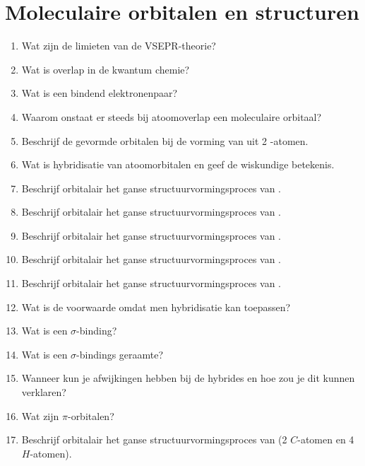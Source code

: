 \documentclass[a4paper,12pt]{article}
\begin{document}
    \maketitle

    \section{Moleculaire orbitalen en structuren}

    \begin{enumerate}
        \item Wat zijn de limieten van de VSEPR-theorie?
        \item Wat is overlap in de kwantum chemie?
        \item Wat is een bindend elektronenpaar?
        \item Waarom onstaat er steeds bij atoomoverlap een moleculaire orbitaal?
        \item Beschrijf de gevormde orbitalen bij de vorming van  uit 2 -atomen.
        \item Wat is hybridisatie van atoomorbitalen en geef de wiskundige betekenis.
        \item Beschrijf orbitalair het ganse structuurvormingsproces van .
        \item Beschrijf orbitalair het ganse structuurvormingsproces van .
        \item Beschrijf orbitalair het ganse structuurvormingsproces van .
        \item Beschrijf orbitalair het ganse structuurvormingsproces van . 
        \item Beschrijf orbitalair het ganse structuurvormingsproces van .
        \item Wat is de voorwaarde omdat men hybridisatie kan toepassen?
        \item Wat is een $\sigma$-binding?
        \item Wat is een $\sigma$-bindings geraamte?
        \item Wanneer kun je afwijkingen hebben bij de hybrides en hoe zou je dit kunnen verklaren?
        \item Wat zijn $\pi$-orbitalen?
        \item Beschrijf orbitalair het ganse structuurvormingsproces van  (2 $C$-atomen en 4 $H$-atomen).

\end{enumerate}
\end{document}
